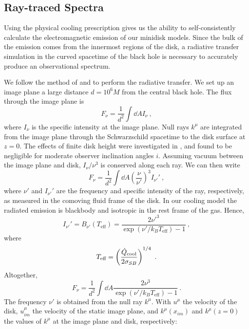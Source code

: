 \subsection{Ray-traced Spectra}

Using the physical cooling prescription  gives us the ability to self-consistently calculate the electromagnetic emission of our minidisk models.  Since the bulk of the emission comes from the innermost regions of the disk, a radiative transfer simulation in the curved spacetime of the black hole is necessary to accurately produce an observational spectrum.

We follow the method of \cite{Kulkarni11} and \cite{Zhu12} to perform the radiative transfer.  We set up an image plane a large distance $d = 10^6 M$ from the central black hole.  The flux through the image plane is
\begin{equation}
	F_\nu = \frac{1}{d^2} \int \dd A I_\nu \ ,
\end{equation}
where $I_\nu$ is the specific intensity at the image plane.  Null rays $k^\mu$ are integrated from the image plane through the Schwarzschild spacetime to the disk surface at $z=0$.  The effects of finite disk height were investigated in \cite{Kulkarni11}, and found to be negligible for moderate observer inclination angles $i$. Assuming vacuum between the image plane and disk, $I_\nu / \nu^3$ is conserved along each ray.  We can then write
\begin{equation}
	F_\nu = \frac{1}{d^2} \int \dd A \left( \frac{\nu}{\nu'} \right)^3 I_{\nu'}' \ ,
\end{equation}
where $\nu'$ and $I_{\nu'}'$ are the frequency and specific intensity of the ray, respectively, as measured in the comoving fluid frame of the disk. In our cooling model  the radiated emission is blackbody and isotropic in the rest frame of the gas.  Hence,
\begin{equation}
	I_{\nu'}' = B_{\nu '} (T_\text{eff}) = \frac{2 {\nu'}^3}{\exp\left(\nu' / k_B T_\text{eff}\right) - 1}\ ,
\end{equation}
where
\begin{equation}
	T_\text{eff} = \left(\frac{\dot{Q}_\text{cool}}{2 \sigma_{SB}} \right)^{1/4} \ .
\end{equation}
Altogether,
\begin{equation}
	F_{\nu} = \frac{1}{d^2} \int \dd A \frac{2 \nu^3}{\exp\left(\nu' / k_B T_\text{eff}\right) - 1} \ .
\end{equation}
The frequency $\nu'$ is obtained from the null ray $k^\mu$.  With $u^\mu$ the velocity of the disk, $u_{im}^\mu$ the velocity of the static image plane, and $k^\mu(x_{im})$ and $k^\mu(z=0)$ the values of $k^\mu$ at the image plane and disk, respectively:
